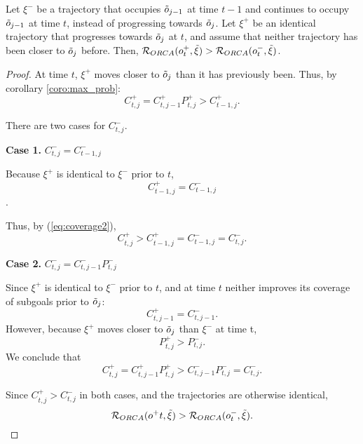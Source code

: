 \begin{proposition}
Let $\xi^{-}$ be a trajectory that occupies $\tilde{o}_{j-1}$ at time $t-1$ and continues to occupy $\tilde{o}_{j-1}$ at time $t$, instead of progressing towards $\tilde{o}_{j}$. Let $\xi^{+}$ be an identical trajectory that progresses towards $\tilde{o}_{j}$ at $t$, and assume that neither trajectory has been closer to $\tilde{o}_{j}$ before. Then, $\mathcal{R}_{ORCA}(o^{+}_t, \tilde{\xi}) > \mathcal{R}_{ORCA}(o^{-}_t, \tilde{\xi})$.
\end{proposition}

\begin{proof}
\label{proof:progress}
At time $t$, $\xi^{+}$ moves closer to $\tilde{o}_{j}$ than it has previously been. Thus, by corollary \ref{coro:max_prob}:
\begin{equation} \label{eq:coverage2}
C^{+}_{t, j} = C^{+}_{t, j-1} P^{+}_{t, j} > C^{+}_{t-1, j}.
\end{equation}

There are two cases for $C^{-}_{t, j}$.

\textbf{Case 1.} $C^{-}_{t, j} = C^{-}_{t-1, j}$

Because $\xi^{+}$ is identical to $\xi^{-}$ prior to $t$,
\begin{equation}C^{+}_{t-1, j} = C^{-}_{t-1, j}\end{equation}.

Thus, by (\ref{eq:coverage2}),
\begin{equation}
C^{+}_{t, j}  > C^{+}_{t-1, j}  = C^{-}_{t-1, j} = C^{-}_{t, j}.
\end{equation}

\textbf{Case 2.} $C^{-}_{t, j} =  C^{-}_{t, j-1}P^{-}_{t, j}$

Since $\xi^{+}$ is identical to $\xi^{-}$ prior to $t$, and at time $t$ neither improves its coverage of subgoals prior to $\tilde{o}_{j}$:
\begin{equation}
C^{+}_{t, j-1} = C^{-}_{t, j-1}.
\end{equation}
However, because $\xi^{+}$ moves closer to $\tilde{o}_{j}$ than $\xi^{-}$ at time t,
\begin{equation}
P^{+}_{t, j} > P^{-}_{t, j}.
\end{equation}
We conclude that
\begin{equation}
C^{+}_{t, j} = C^{+}_{t, j-1}P^{+}_{t, j} > C^{-}_{t, j-1}P^{-}_{t, j} = C^{-}_{t, j}.
\end{equation}

Since $C^{+}_{t, j} > C^{-}_{t, j}$ in both cases, and the trajectories are otherwise identical,
\begin{equation}
\mathcal{R}_{ORCA}(o^{+}t, \tilde{\xi}) > \mathcal{R}_{ORCA}(o^{-}_t, \tilde{\xi}).
\end{equation}
\end{proof}

